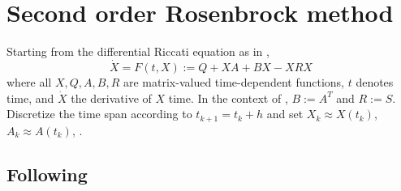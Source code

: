 \chapter{Second order Rosenbrock method}

Starting from the differential Riccati equation as in \cite{MPIMD11-06},
\begin{equation}
  \dot X = F(t, X) := Q + XA + BX - XRX
\end{equation}
where all $X, Q, A, B, R$ are matrix-valued time-dependent functions,
$t$ denotes time, and $\dot X$ the derivative of $X$ \wrt time.
In the context of \cite{Mena2007,MPIMD12-13,Lang2015}, $B:=A^T$ and $R:=S$.
Discretize the time span according to $t_{k+1} = t_k + h$
and set $X_k \approx X(t_k)$, $A_k \approx A(t_k)$, \etc.

\section{Following \cite{Mena2007}}

